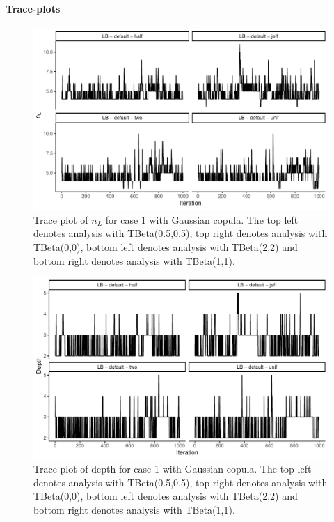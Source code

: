 \documentclass{amsart}
\begin{document}
\paragraph{Trace-plots}

\begin{figure}
	\centering
	\includegraphics[width = 0.75\linewidth]{trace_case1_gauss_nterm.pdf}
	\caption{Trace plot of $n_L$ for case 1 with Gaussian copula. The top left denotes analysis with TBeta(0.5,0.5), top right denotes analysis with TBeta(0,0), bottom left denotes analysis with TBeta(2,2) and bottom right denotes analysis with TBeta(1,1).}
	\label{fig:case1:gauss:nterm}
\end{figure}

\begin{figure}
	\centering
	\includegraphics[width = 0.75\linewidth]{trace_case1_gauss_depth.pdf}
	\caption{Trace plot of depth for case 1 with Gaussian copula. The top left denotes analysis with TBeta(0.5,0.5), top right denotes analysis with TBeta(0,0), bottom left denotes analysis with TBeta(2,2) and bottom right denotes analysis with TBeta(1,1).}
	\label{fig:case1:gauss:depth}
\end{figure}
\end{document}
